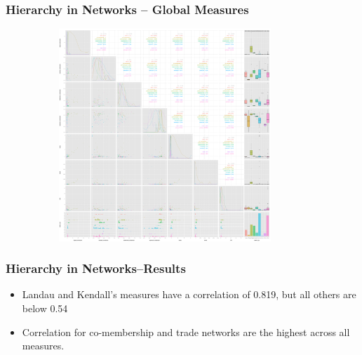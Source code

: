 \documentclass[xcolor={table}]{beamer}
\newenvironment{changemargin}[2]{%
  \begin{list}{}{%
    \setlength{\topsep}{0pt}%
    \setlength{\leftmargin}{#1}%
    \setlength{\rightmargin}{#2}%
    \setlength{\listparindent}{\parindent}%
    \setlength{\itemindent}{\parindent}%
    \setlength{\parsep}{\parskip}%
  }%
  \item[]}{\end{list}}
\begin{document}
\begin{frame}\frametitle{Hierarchy in Networks -- Global Measures}
\begin{changemargin}{-2cm}{ -2cm}
	\centering
	\includegraphics[width=12cm, height=8cm]{images/Fancy_Pairs_Plot.pdf}
\end{changemargin}
\end{frame}

\begin{frame}\frametitle{Hierarchy in Networks--Results}
	\begin{itemize}
		\item Landau and Kendall's measures have a correlation of 0.819, but all others are below 0.54
		\item Correlation for co-membership and trade networks are the highest across all measures. 
	\end{itemize}
\end{frame}
\end{document}
